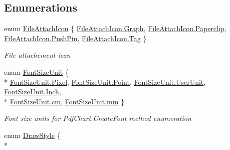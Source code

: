 \subsection*{Enumerations}
\begin{DoxyCompactItemize}
\item 
enum \hyperlink{namespace_pdf_file_writer_affdf4557b631fa40566a334144b05ae5}{File\+Attach\+Icon} \{ \hyperlink{namespace_pdf_file_writer_affdf4557b631fa40566a334144b05ae5a4cdbd2bafa8193091ba09509cedf94fd}{File\+Attach\+Icon.\+Graph}, 
\hyperlink{namespace_pdf_file_writer_affdf4557b631fa40566a334144b05ae5ae732a6a4cd5b76d1333751657b406ee3}{File\+Attach\+Icon.\+Paperclip}, 
\hyperlink{namespace_pdf_file_writer_affdf4557b631fa40566a334144b05ae5a9296f4f8bfc9fcfe28e3558866ba6863}{File\+Attach\+Icon.\+Push\+Pin}, 
\hyperlink{namespace_pdf_file_writer_affdf4557b631fa40566a334144b05ae5ac101058e7ea21bbbf2a5ac893088e90b}{File\+Attach\+Icon.\+Tag}
 \}\begin{DoxyCompactList}\small\item\em File attachement icon \end{DoxyCompactList}
\item 
enum \hyperlink{namespace_pdf_file_writer_adf167276d483eb5d597fed4e3297ba17}{Font\+Size\+Unit} \{ \\*
\hyperlink{namespace_pdf_file_writer_adf167276d483eb5d597fed4e3297ba17a08822b3ae4e2aede0afe08abe600e9c0}{Font\+Size\+Unit.\+Pixel}, 
\hyperlink{namespace_pdf_file_writer_adf167276d483eb5d597fed4e3297ba17a2a3cd5946cfd317eb99c3d32e35e2d4c}{Font\+Size\+Unit.\+Point}, 
\hyperlink{namespace_pdf_file_writer_adf167276d483eb5d597fed4e3297ba17a6663afb6af0ae14a64f545a892746fa8}{Font\+Size\+Unit.\+User\+Unit}, 
\hyperlink{namespace_pdf_file_writer_adf167276d483eb5d597fed4e3297ba17abee12d309ba5730e1e121733b7b67956}{Font\+Size\+Unit.\+Inch}, 
\\*
\hyperlink{namespace_pdf_file_writer_adf167276d483eb5d597fed4e3297ba17a820eb5b696ea2a657c0db1e258dc7d81}{Font\+Size\+Unit.\+cm}, 
\hyperlink{namespace_pdf_file_writer_adf167276d483eb5d597fed4e3297ba17ab3cd915d758008bd19d0f2428fbb354a}{Font\+Size\+Unit.\+mm}
 \}\begin{DoxyCompactList}\small\item\em Font size units for Pdf\+Chart.\+Create\+Font method enumeration \end{DoxyCompactList}
\item 
enum \hyperlink{namespace_pdf_file_writer_a2bcdd73c6cedab15d6f6c2a64333ef39}{Draw\+Style} \{ \\*

\end{DoxyCompactItemize}
